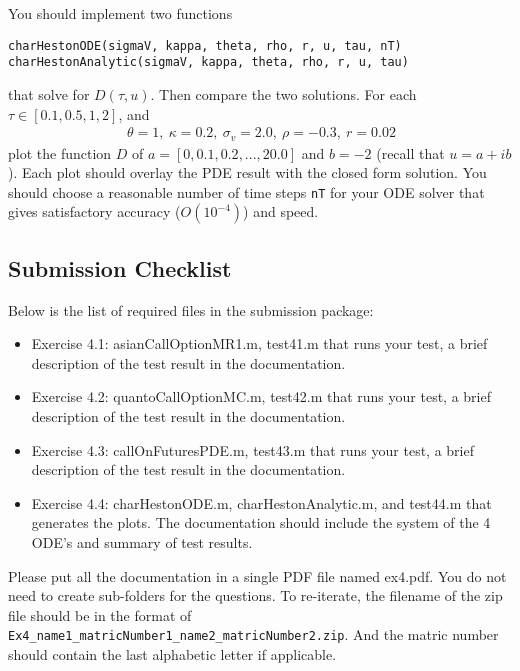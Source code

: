 \documentclass[10pt,a4paper,hidelinks,fleqn]{article}            %
\begin{document}
You should implement two functions
\begin{verbatim}
charHestonODE(sigmaV, kappa, theta, rho, r, u, tau, nT)
charHestonAnalytic(sigmaV, kappa, theta, rho, r, u, tau)
\end{verbatim}
that solve for $D(\tau, u)$. 
Then compare the two solutions. For each $\tau \in [0.1, 0.5, 1, 2]$, and
\begin{align*}
~\theta = 1, ~\kappa = 0.2, ~\sigma_v = 2.0, ~\rho = -0.3, ~r = 0.02
\end{align*}
plot the function $D$ of $a = [0, 0.1, 0.2, ..., 20.0]$ and $b = -2$ (recall that $u = a+ib$). 
Each plot should overlay the PDE result with the closed form solution.
You should choose a reasonable number of time steps \verb=nT= for your ODE solver that gives satisfactory accuracy ($O(10^{-4})$) and speed.


\subsection*{Submission Checklist}
Below is the list of required files in the submission package:
\begin{itemize}
\item Exercise 4.1: asianCallOptionMR1.m, test41.m that runs your test, a brief description of the test result in the documentation.
\item Exercise 4.2: quantoCallOptionMC.m, test42.m that runs your test, a brief description of the test result in the documentation.
\item Exercise 4.3: callOnFuturesPDE.m, test43.m that runs your test, a brief description of the test result in the documentation.
\item Exercise 4.4: charHestonODE.m, charHestonAnalytic.m, and test44.m that generates the plots. The documentation should include the system of the 4 ODE's and summary of test results.
\end{itemize}
Please put all the documentation in a single PDF file named ex4.pdf.
You do not need to create sub-folders for the questions. 
To re-iterate, the filename of the zip file should be in the format of \verb=Ex4_name1_matricNumber1_name2_matricNumber2.zip=.
And the matric number should contain the last alphabetic letter if applicable. 




\end{document}
